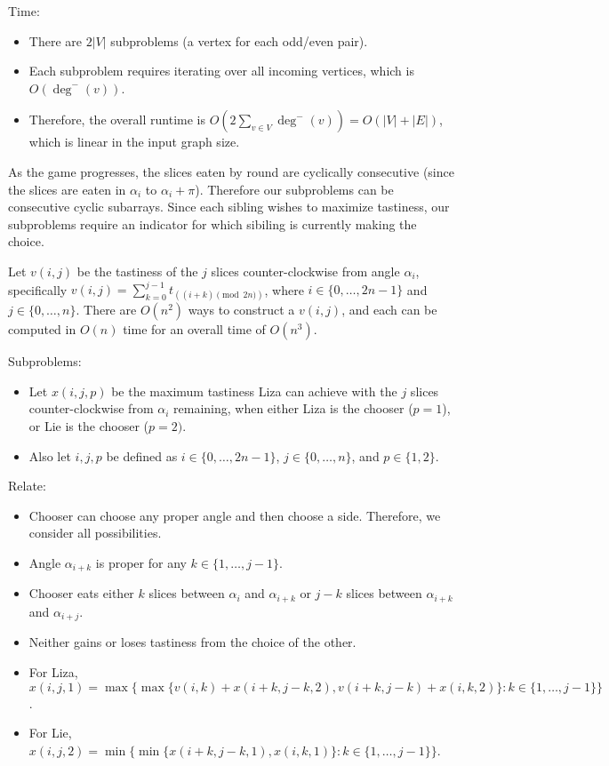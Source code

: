 \documentclass[12pt,twoside]{article}
\begin{document}
\begin{problems}
Time:
\begin{itemize}
    \item There are $2|V|$ subproblems (a vertex for each odd/even pair).
    \item Each subproblem requires iterating over all incoming vertices, which is $O(\deg^-(v))$.
    \item Therefore, the overall runtime is $O(2 \sum_{v \in V} \deg^-(v))=O(|V|+|E|)$, which is linear in the input graph size.
\end{itemize}

\newpage
\problem  %
As the game progresses, the slices eaten by round are cyclically consecutive (since the slices are eaten in $\alpha_i$ to $\alpha_i+\pi$). Therefore our subproblems can be consecutive cyclic subarrays. Since each sibling wishes to maximize tastiness, our subproblems require an indicator for which sibiling is currently making the choice.

Let $v(i,j)$ be the tastiness of the $j$ slices counter-clockwise from angle $\alpha_i$, specifically $v(i,j)=\sum_{k=0}^{j-1}t_{((i+k)\pmod{2n})}$, where $i\in \{0,\ldots,2n-1\}$ and $j\in \{0,\ldots,n\}$. There are $O(n^2)$ ways to construct a $v(i,j)$, and each can be computed in $O(n)$ time for an overall time of $O(n^3)$.

Subproblems:
\begin{itemize}
    \item Let $x(i,j,p)$ be the maximum tastiness Liza can achieve with the $j$ slices counter-clockwise from $\alpha_i$ remaining, when either Liza is the chooser ($p=1$), or Lie is the chooser ($p=2)$. 
    \item Also let $i,j,p$ be defined as $i \in \{0,\ldots,2n-1\}$, $j \in \{0,\ldots,n\}$, and $p\in \{1,2\}$.
\end{itemize}

Relate:
\begin{itemize}
    \item Chooser can choose any proper angle and then choose a side. Therefore, we consider all possibilities.
    \item Angle $\alpha_{i+k}$ is proper for any $k \in \{1,\ldots,j-1\}$.
    \item Chooser eats either $k$ slices between $\alpha_i$ and $\alpha_{i+k}$ or $j-k$ slices between $\alpha_{i+k}$ and $\alpha_{i+j}$.
    \item Neither gains or loses tastiness from the choice of the other.
    \item For Liza, $x(i,j,1)=\max\{\max\{v(i,k)+x(i+k,j-k,2), v(i+k,j-k)+x(i,k,2)\} : k \in \{1,\ldots,j-1\}\}$.
    \item For Lie, $x(i,j,2)=\min\{\min\{x(i+k,j-k,1),x(i,k,1)\} : k \in \{1,\ldots,j-1\}\}$.
\end{itemize}


\end{problems}
\end{document}
